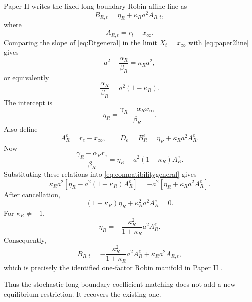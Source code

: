 \documentclass[11pt]{article}
\numberwithin{equation}{section}
\begin{document}
Paper II writes the fixed-long-boundary Robin affine line as
\begin{equation}
 B_{R,t}=\eta_R+\kappa_Ra^2A_{R,t},
 \label{eq:paper2line}
\end{equation}
where
\begin{equation}
 A_{R,t}=r_t-x_\infty.
\end{equation}
Comparing the slope of \eqref{eq:Dtgeneral} in the limit $X_t=x_\infty$ with \eqref{eq:paper2line} gives
\begin{equation}
 {
 a^2-\frac{\alpha_R}{\beta_R}=\kappa_Ra^2,
 }
 \label{eq:kappamap}
\end{equation}
or equivalently
\begin{equation}
 \frac{\alpha_R}{\beta_R}=a^2(1-\kappa_R).
\end{equation}
The intercept is
\begin{equation}
 {
 \eta_R=\frac{\gamma_R-\alpha_Rx_\infty}{\beta_R}.
 }
 \label{eq:etamap}
\end{equation}
Also define
\begin{equation}
 A_R^e=r_e-x_\infty,
 \qquad
 D_e=B_R^e=\eta_R+\kappa_Ra^2A_R^e.
\end{equation}
Now
\begin{equation}
 \frac{\gamma_R-\alpha_Rr_e}{\beta_R}
 =\eta_R-a^2(1-\kappa_R)A_R^e.
\end{equation}
Substituting these relations into \eqref{eq:compatibilitygeneral} gives
\begin{equation}
 \kappa_Ra^2
 \left[
 \eta_R-a^2(1-\kappa_R)A_R^e
 \right]
 =-a^2\left[
 \eta_R+\kappa_Ra^2A_R^e
 \right].
\end{equation}
After cancellation,
\begin{equation}
 (1+\kappa_R)\eta_R+\kappa_R^2a^2A_R^e=0.
\end{equation}
For $\kappa_R\neq-1$,
\begin{equation}
 {
 \eta_R
 =-\frac{\kappa_R^2}{1+\kappa_R}a^2A_R^e.
 }
 \label{eq:paper2identification}
\end{equation}
Consequently,
\begin{equation}
 {
 B_{R,t}
 =-\frac{\kappa_R^2}{1+\kappa_R}a^2A_R^e
 +\kappa_Ra^2A_{R,t},
 }
 \label{eq:paper2manifold}
\end{equation}
which is precisely the identified one-factor Robin manifold in Paper II \cite{OzaShortBoundary}.

Thus the stochastic-long-boundary coefficient matching does not add a new equilibrium restriction. It recovers the existing one.
\end{document}
